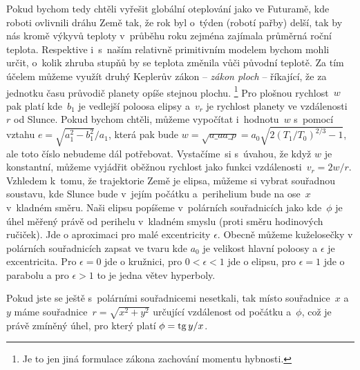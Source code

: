 \documentclass[twoside]{fksserie}
\begin{document}
Pokud bychom tedy chtěli vyřešit globální oteplování jako ve Futuramě,
kde roboti ovlivnili dráhu Země tak, že rok byl o~týden (robotí pařby)
delší, tak by nás kromě výkyvů teploty v~průběhu roku zejména zajímala
průměrná roční teplota. Respektive i~s~naším relativně primitivním modelem
bychom mohli určit, o~kolik zhruba stupňů by se teplota změnila vůči 
původní teplotě. Za tím účelem můžeme využít druhý Keplerův zákon -- {\it zákon
ploch} -- říkající, že za jednotku času průvodič planety opíše stejnou plochu.%
\footnote{Je to jen jiná formulace zákona zachování momentu hybnosti.}
Pro plošnou rychlost~$w$ pak platí
kde~$b_1$ je vedlejší poloosa elipsy a~$v_r$ je rychlost planety ve 
vzdálenosti~$r$ od Slunce. Pokud bychom chtěli, můžeme vypočítat
i~hodnotu~$w$ s~pomocí vztahu $e = {\sqrt{a_1^2 - b_1^2}}/{a_1}$, 
která pak bude $w = \sqrt{a\_a a\_p} = a_0 
\sqrt{2 \left( {T_1}/{T_0} \right) ^{2/3} -1 }$, ale toto číslo
nebudeme dál potřebovat. Vystačíme~si s~úvahou, že když $w$ je 
konstantní, můžeme vyjádřit oběžnou rychlost jako funkci vzdálenosti~$v_r =
{2w}/{r}$.
Vzhledem k~tomu, že trajektorie Země je elipsa,
můžeme si vybrat souřadnou soustavu, kde Slunce bude v~jejím počátku
a~perihelium bude na ose~$x$ v~kladném směru. Naši elipsu popíšeme v~polárních 
souřadnicích jako 
kde~$\phi$ je úhel měřený právě od perihelu v~kladném smyslu (proti směru 
hodinových ručiček). Jde o aproximaci pro malé excentricity $\epsilon$. 
Obecně můžeme kuželosečky v polárních souřadnicích zapsat ve tvaru 
kde $a_0$ je velikost hlavní poloosy a $\epsilon$ je excentricita. Pro 
$\epsilon=0$ jde o kružnici, pro $0<\epsilon<1$ jde o elipsu, pro 
$\epsilon=1$ jde o parabolu a pro $\epsilon>1$ to je jedna větev hyperboly.

Pokud jste se ještě s~polárními souřadnicemi nesetkali,
tak místo souřadnice~$x$ a~$y$ máme souřadnice~$r = \sqrt{x^2 + y^2}$ 
určující vzdálenost od počátku a~$\phi$, což je právě zmíněný úhel, pro
který platí $\phi = \mathop\mathrm{tg}\nolimits {y}/{x}$.
\end{document}
